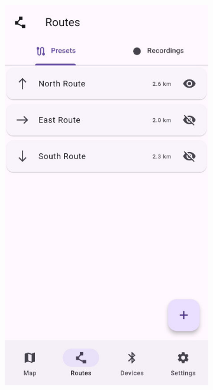 \begin{figure}[!htb]
\begin{subfigure}{.25\textwidth}
        \includegraphics[width=.8666\linewidth]{images/app_routes_screen.jpg}
        \caption{\routesscreen}
        \label{subfig:app_routes_screen}
    \end{subfigure}%
    \begin{subfigure}{.25\textwidth}
        \centering

\end{subfigure}
\end{figure}

